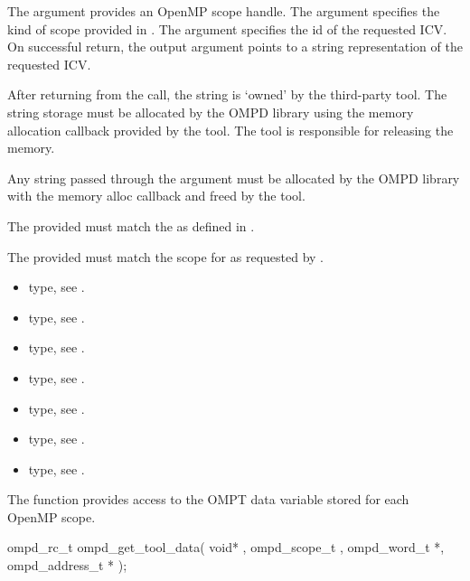 \argdesc

The argument  provides an OpenMP scope handle.
The argument  specifies the kind of scope provided in .
The argument  specifies the id of the requested ICV.
On successful return, the output argument  points to a string 
representation of the requested ICV.

After returning from the call, the string  is `owned' by the third-party 
tool.
The string storage must be allocated by the OMPD library using the memory allocation 
callback provided by the tool.
The tool is responsible for releasing the memory.


\constraints
Any string passed through the argument  must be allocated by the OMPD 
library with the memory alloc callback  and freed 
by the tool.

The provided  must match the  as defined in 
. 

The provided  must match the scope for  as requested by 
. 


\crossreferences
\begin{itemize}
	\item {} type, see 
	.
	\item {} type, see .
	\item {} type, see 
	.
	\item {} type, see .
	\item {} type, see .
	\item {} type, see .
	\item {} type, see .
\end{itemize}

\label{subsubsubsec:ompd_get_tool_data}
\summary
The  function provides access to the OMPT data variable 
stored for each OpenMP scope.

\format

\begin{cspecific}
\begin{ompSyntax}
ompd_rc_t ompd_get_tool_data(
  void* , 
  ompd_scope_t ,
  ompd_word_t *,
  ompd_address_t *
);
\end{ompSyntax}
\end{cspecific}

